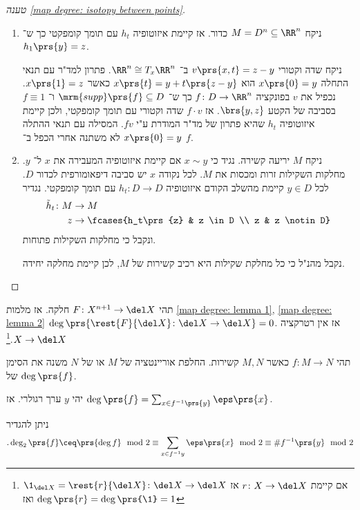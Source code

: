 \documentclass[a4paper,10pt,twoside,openany]{book}
\begin{document}
\begin{proof}[טענה \ref{map degree: isotopy between points}]

\begin{enumerate}[label = שלב \Roman*:]
\item
ניקח
$M = D^n \subseteq \RR^n$
כדור.
אז קיימת איזוטופיה
$h_t$
עם תומך קומפקטי כך ש־%
$h_1\prs{y} = z$.

ניקח שדה וקטורי
$v\prs{x,t} = z - y$
ב־%
$\RR^n \cong T_x \RR^n$.
פתרון למד"ר עם תנאי התחלה
$x\prs{0} = y$
הוא
$x\prs{t} = y + t\prs{z-y}$
כאשר
$x\prs{1} = z$.
נכפיל את
$v$
בפונקציה
$f \colon D \to \RR^n$
כך ש־%
$\mrm{supp}\prs{f} \subseteq D$
ו־%
$f \equiv 1$
בסביבה של הקטע
$\brs{y,z}$.
אז
$f \cdot v$
שדה וקטורי עם תומך קומפקטי, ולכן קיימת איזוטופיה
$h_t$
שהיא פתרון של מד"ר המודרת ע"י
$fv$.
המסילה עם תנאי ההתלה
$x\prs{0}  = y$
לא משתנה אחרי הכפל ב־%
$f$.
\item
ניקח
$M$
יריעה קשירה.
נגיד כי
$x \sim y$
אם קיימת איזוטופיה המעבירה את
$x$
ל־%
$y$.
מחלקות השקילות זרות ומכסות את
$M$.
לכל נקודה
$x$
יש סביבה דיפאומורפית לכדור
$D$.
לכל
$y \in D$
קיימת מהשלב הקודם איזוטופיה
$h_t \colon D \to D$
עם תומך קומפקטי. נגדיר
\begin{align*}
\tilde{h}_t \colon M &\to M \\
z &\to \fcases{h_t\prs{z} & z \in D \\ z & z \notin D}
\end{align*}
ונקבל כי מחלקות השקילות פתוחות.

נקבל מהנ"ל כי כל מחלקת שקילות היא רכיב קשירות של
$M$,
לכן קיימת מחלקה יחידה.
\end{enumerate}

\end{proof}

\begin{remark}
תהי
$F \colon X^{n+1} \to \del X$
חלקה.
אז מלמות
\ref{map degree: lemma 1}, \ref{map degree: lemma 2}
$\deg\prs{\rest{F}{\del X} \colon \del X \to \del X} = 0$.
אז אין רטרקציה
$X \to \del X$.\footnote{אם קיימת
$r \colon X \to \del X$
אז
$\1_{\del X} = \rest{r}{\del X} \colon \del X \to \del X$
ואז
$\deg\prs{r} = \deg\prs{\1} = 1$}
\end{remark}

\begin{remark}
תהי
$f \colon M \to N$
כאשר
$M,N$
קשירות.
החלפת אוריינטציה  של
$M$
או של
$N$
משנה את הסימן של
$\deg\prs{f}$.
\end{remark}

\begin{remark}
יהי
$y$
ערך רגולרי.
אז
$\deg\prs{f} = \sum_{x \in f^{-1}\prs{y}} \eps\prs{x}$.

ניתן להגדיר
\[\text{.} \deg_2\prs{f} \ceq \prs{\deg f} \mod{2} \equiv \sum_{x \in f^{-1} y} \eps\prs{x} \mod{2} \equiv \# f^{-1}\prs{y} \mod{2}\]
\end{remark}
\end{document}

